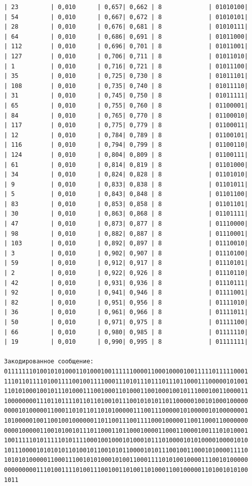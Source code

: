 \documentclass[a4paper,14pt]{extarticle}
\begin{document}
\begin{enumerate}
\begin{verbatim}
| 23         | 0,010      | 0,657| 0,662 | 8             | 01010100|
| 54         | 0,010      | 0,667| 0,672 | 8             | 01010101|
| 28         | 0,010      | 0,676| 0,681 | 8             | 01010111|
| 64         | 0,010      | 0,686| 0,691 | 8             | 01011000|
| 112        | 0,010      | 0,696| 0,701 | 8             | 01011001|
| 127        | 0,010      | 0,706| 0,711 | 8             | 01011010|
| 1          | 0,010      | 0,716| 0,721 | 8             | 01011100|
| 35         | 0,010      | 0,725| 0,730 | 8             | 01011101|
| 108        | 0,010      | 0,735| 0,740 | 8             | 01011110|
| 31         | 0,010      | 0,745| 0,750 | 8             | 01011111|
| 65         | 0,010      | 0,755| 0,760 | 8             | 01100001|
| 84         | 0,010      | 0,765| 0,770 | 8             | 01100010|
| 117        | 0,010      | 0,775| 0,779 | 8             | 01100011|
| 12         | 0,010      | 0,784| 0,789 | 8             | 01100101|
| 116        | 0,010      | 0,794| 0,799 | 8             | 01100110|
| 124        | 0,010      | 0,804| 0,809 | 8             | 01100111|
| 61         | 0,010      | 0,814| 0,819 | 8             | 01101000|
| 34         | 0,010      | 0,824| 0,828 | 8             | 01101010|
| 9          | 0,010      | 0,833| 0,838 | 8             | 01101011|
| 5          | 0,010      | 0,843| 0,848 | 8             | 01101100|
| 83         | 0,010      | 0,853| 0,858 | 8             | 01101101|
| 30         | 0,010      | 0,863| 0,868 | 8             | 01101111|
| 47         | 0,010      | 0,873| 0,877 | 8             | 01110000|
| 98         | 0,010      | 0,882| 0,887 | 8             | 01110001|
| 103        | 0,010      | 0,892| 0,897 | 8             | 01110010|
| 3          | 0,010      | 0,902| 0,907 | 8             | 01110100|
| 59         | 0,010      | 0,912| 0,917 | 8             | 01110101|
| 2          | 0,010      | 0,922| 0,926 | 8             | 01110110|
| 42         | 0,010      | 0,931| 0,936 | 8             | 01110111|
| 92         | 0,010      | 0,941| 0,946 | 8             | 01111001|
| 82         | 0,010      | 0,951| 0,956 | 8             | 01111010|
| 36         | 0,010      | 0,961| 0,966 | 8             | 01111011|
| 50         | 0,010      | 0,971| 0,975 | 8             | 01111100|
| 66         | 0,010      | 0,980| 0,985 | 8             | 01111110|
| 19         | 0,010      | 0,990| 0,995 | 8             | 01111111|

Закодированное сообщение: 
01111111010010101000110100010011111100001100010000100111110111110001
11101101111010011110010011110001110101110111011101100011100000101001
11010100010010111010001110010001101000110010001001011100010011000011
10000000011101101111011011010010111001010101101100000100101000100000
00001010000011000110101101101010000011100111000001010000010100000001
10100000100110010010000001101100111001111000100000110011000110000000
00001000001100101001011101100011011000100001100011000010011101010001
10011111010111110101111000100100010100010111010000101010000100001010
10111000010101010110100101100101011000010101110010011000101000011110
10101010000011000111001010100010100110001111010100100001110010100000
00000000011101001111010011100100110100110100011001000001101001010100
1011


\end{verbatim}
\end{enumerate}
\end{document}
